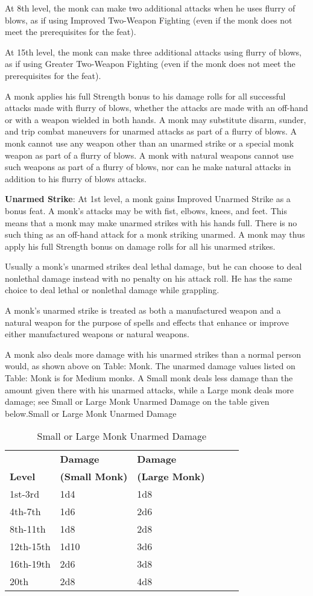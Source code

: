 At 8th level, the monk can make two additional attacks when he uses flurry of blows, as if using Improved Two-Weapon Fighting (even if the monk does not meet the prerequisites for the feat).
				
At 15th level, the monk can make three additional attacks using flurry of blows, as if using Greater Two-Weapon Fighting (even if the monk does not meet the prerequisites for the feat). 
				
A monk applies his full Strength bonus to his damage rolls for all successful attacks made with flurry of blows, whether the attacks are made with an off-hand or with a weapon wielded in both hands. A monk may substitute disarm, sunder, and trip combat maneuvers for unarmed attacks as part of a flurry of blows. A monk cannot use any weapon other than an unarmed strike or a special monk weapon as part of a flurry of blows. A monk with natural weapons cannot use such weapons as part of a flurry of blows, nor can he make natural attacks in addition to his flurry of blows attacks.
				
\textbf{Unarmed Strike}: At 1st level, a monk gains Improved Unarmed Strike as a bonus feat. A monk's attacks may be with fist, elbows, knees, and feet. This means that a monk may make unarmed strikes with his hands full. There is no such thing as an off-hand attack for a monk striking unarmed. A monk may thus apply his full Strength bonus on damage rolls for all his unarmed strikes.
				
Usually a monk's unarmed strikes deal lethal damage, but he can choose to deal nonlethal damage instead with no penalty on his attack roll. He has the same choice to deal lethal or nonlethal damage while grappling.
				
A monk's unarmed strike is treated as both a manufactured weapon and a natural weapon for the purpose of spells and effects that enhance or improve either manufactured weapons or natural weapons.
				
A monk also deals more damage with his unarmed strikes than a normal person would, as shown above on Table: Monk. The unarmed damage values listed on Table: Monk is for Medium monks. A Small monk deals less damage than the amount given there with his unarmed attacks, while a Large monk deals more damage; see Small or Large Monk Unarmed Damage on the table given below.Small or Large Monk Unarmed Damage
\begin{table}[]
\sffamily
\caption{Small or Large Monk Unarmed Damage}
\begin{tabular}{llllll}
               & \textbf{Damage} & \textbf{Damage} \\
\textbf{Level} & \textbf{(Small Monk)} & \textbf{(Large Monk)}\\
1st-3rd   & 1d4  & 1d8 \\
4th-7th   & 1d6  & 2d6 \\
8th-11th  & 1d8  & 2d8 \\
12th-15th & 1d10 & 3d6 \\
16th-19th & 2d6  & 3d8 \\
20th & 2d8 & 4d8\\
\end{tabular}
\end{table}
		
